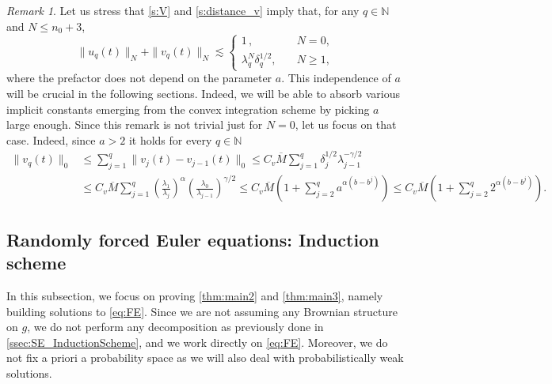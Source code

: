 \documentclass[10pt,a4paper]{amsart}
\numberwithin{equation}{section}
\numberwithin{corollario}{section}
\numberwithin{lemma}{section}
\numberwithin{prop}{section}
\theoremstyle{definition}
\theoremstyle{remark}
\newtheorem{oss}[thm]{Remark}
\newcommand{\N}{\mathbb{N}}
\newcommand{\oM}{\overline{M}}
\begin{document}
\begin{oss}
    Let us stress that \eqref{s:V} and \eqref{s:distance_v} imply that, for any $q\in \N$ and $N\le n_0+3$,
    \begin{equation}\label{s:estUqN}
        \|u_q(t)\|_N+\|v_q(t)\|_N\lesssim 
        \begin{cases}
        1\,,\quad &N=0,\\
        \lambda_q^N\delta_q^{1/2},\quad &N \geq 1,
        \end{cases}
    \end{equation}
    where the prefactor does not depend on the parameter $a$. This independence of $a$ will be crucial in the following sections. Indeed, we will be able to absorb various implicit constants emerging from the convex integration scheme by picking $a$ large enough.
    Since this remark is not trivial just for $N=0$, let us focus on that case. Indeed, since $a>2$ it holds for every $q \in \N$ 
    \begin{equation}
    \begin{aligned}
        \|v_q(t)\|_0&\le \sum_{j=1}^q \|v_j(t)-v_{j-1}(t)\|_0\le C_v \oM\sum_{j=1}^q\delta_j^{1/2}\lambda_{j-1}^{-\gamma/2}\\
        &\le C_v \oM\sum_{j=1}^q\left(\frac{\lambda_1}{\lambda_j}\right)^{\alpha}\left(\frac{\lambda_0}{\lambda_{j-1}}\right)^{\gamma/2}\le C_v \oM\left(1+\sum_{j=2}^{q}a^{\alpha (b-b^j)}\right)\le C_v \oM \left(1+\sum_{j=2}^{q}2^{\alpha (b-b^j)}\right).
    \end{aligned}
    \end{equation}
\end{oss}

\subsection{Randomly forced Euler equations: Induction scheme}\label{ssec:FE_InductionScheme}
In this subsection, we focus on proving \autoref{thm:main2} and \autoref{thm:main3}, namely building solutions to \eqref{eq:FE}. Since we are not assuming any Brownian structure on $g$, we do not perform any decomposition as previously done in \autoref{ssec:SE_InductionScheme}, and we work directly on \eqref{eq:FE}.
Moreover, we do not fix a priori a probability space as we will also deal with probabilistically weak solutions.
\end{document}
